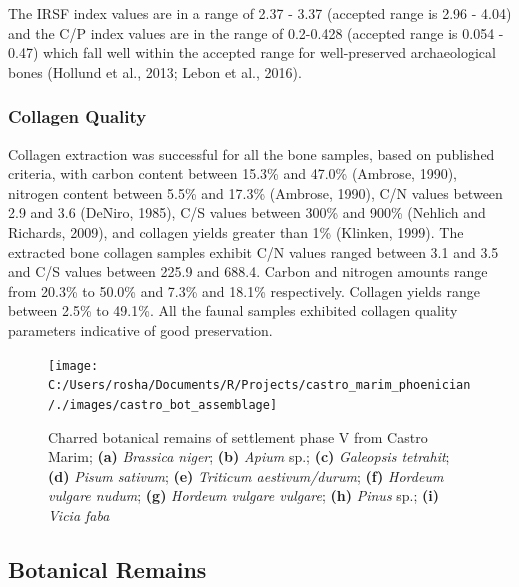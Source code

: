 \documentclass[5p]{elsarticle} %
\begin{document}
The IRSF index values are in a range of 2.37 - 3.37 (accepted range is 2.96 - 4.04) and the C/P index values are in the range of 0.2-0.428 (accepted range is 0.054 - 0.47) which fall well within the accepted range for well-preserved archaeological bones (Hollund et al., 2013; Lebon et al., 2016).

\hypertarget{collagen-quality}{%
\subsubsection{Collagen Quality}\label{collagen-quality}}

Collagen extraction was successful for all the bone samples, based on published criteria, with carbon content between 15.3\% and 47.0\% (Ambrose, 1990), nitrogen content between 5.5\% and 17.3\% (Ambrose, 1990), C/N values between 2.9 and 3.6 (DeNiro, 1985), C/S values between 300\% and 900\% (Nehlich and Richards, 2009), and collagen yields greater than 1\% (Klinken, 1999). The extracted bone collagen samples exhibit C/N values ranged between 3.1 and 3.5 and C/S values between 225.9 and 688.4. Carbon and nitrogen amounts range from 20.3\% to 50.0\% and 7.3\% and 18.1\% respectively. Collagen yields range between 2.5\% to 49.1\%. All the faunal samples exhibited collagen quality parameters indicative of good preservation.



\begin{figure}
\texttt{[image: C:/Users/rosha/Documents/R/Projects/castro\_marim\_phoenician/./images/castro\_bot\_assemblage]} \caption{Charred botanical remains of settlement phase V from Castro Marim; \textbf{(a)} \emph{Brassica niger}; \textbf{(b)} \emph{Apium} sp.; \textbf{(c)} \emph{Galeopsis tetrahit}; \textbf{(d)} \emph{Pisum sativum}; \textbf{(e)} \emph{Triticum aestivum/durum}; \textbf{(f)} \emph{Hordeum vulgare nudum}; \textbf{(g)} \emph{Hordeum vulgare vulgare}; \textbf{(h)} \emph{Pinus} sp.; \textbf{(i)} \emph{Vicia faba}}\label{fig:castro-archbot-assemblage}
\end{figure}

\hypertarget{botanical-remains}{%
\subsection{Botanical Remains}\label{botanical-remains}}
\end{document}
